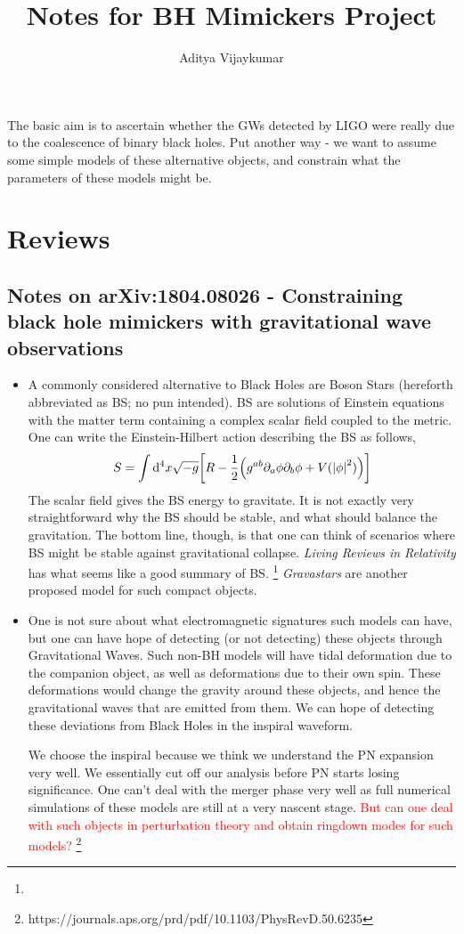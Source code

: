 \documentclass[a4paper,11pt]{article}
\title{\textbf{Notes for BH Mimickers Project}}
\author{Aditya Vijaykumar}
\affiliation{International Centre for Theoretical Sciences, Bengaluru, India.}
\begin{document}
\maketitle

The basic aim is to ascertain whether the GWs detected by LIGO were really due to the coalescence of binary black holes. Put another way - we want to assume some simple models of these alternative objects, and constrain what the parameters of these models might be.

\section{Reviews}

\subsection{Notes on arXiv:1804.08026 - Constraining black hole mimickers with gravitational wave observations}

\begin{itemize}
	\item A commonly considered alternative to Black Holes are Boson Stars (hereforth abbreviated as BS; no pun intended). BS are solutions of Einstein equations with the matter term containing a complex scalar field coupled to the metric. One can write the Einstein-Hilbert action describing the BS as follows,
	\begin{equation*}
	S = \int \dd^4{x} \sqrt{-g}\qty[R - \dfrac{1}{2} \qty(g^{ab} \partial_a \phi \partial_b \phi   + V(\abs{\phi}^2))]
	\end{equation*}
	The scalar field gives the BS energy to gravitate. It is not exactly very straightforward why the BS should be stable, and what should balance the gravitation. The bottom line, though, is that one can think of scenarios where BS might be stable against gravitational collapse. \textit{Living Reviews in Relativity} has what seems like a good summary of BS. \footnote{} \textit{Gravastars} are another proposed model for such compact objects.
	
	\item One is not sure about what electromagnetic signatures such models can have, but one can have hope of detecting (or not detecting) these objects through Gravitational Waves. Such non-BH models will have tidal deformation due to the companion object, as well as deformations due to their own spin. These deformations would change the gravity around these objects, and hence the gravitational waves that are emitted from them. We can hope of detecting these deviations from Black Holes in the inspiral waveform.
	
	We choose the inspiral because we think we understand the PN expansion very well. We essentially cut off our analysis before PN starts losing significance. One can't deal with the merger phase very well as full numerical simulations of these models are still at a very nascent stage. \textcolor{red}{But can one deal with such objects in perturbation theory and obtain ringdown modes for such models?} \footnote{https://journals.aps.org/prd/pdf/10.1103/PhysRevD.50.6235}
\end{itemize}
\end{document}
